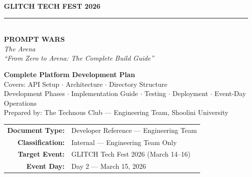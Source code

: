 \documentclass[11pt, a4paper]{article}
\begin{document}

\begin{titlepage}
    \centering
    \vspace*{1cm}
    {\Huge\bfseries\textcolor{primaryblue}{GLITCH TECH FEST 2026}\\[0.3cm]}
    \textcolor{accentgold}{\rule{0.7\textwidth}{2pt}}\\[0.8cm]
    {\fontsize{30}{36}\selectfont\bfseries\textcolor{primaryblue}{PROMPT WARS}}\\[0.2cm]
    {\LARGE\textcolor{sectionblue}{\textit{The Arena}}}\\[0.6cm]
    {\large\textcolor{darktext}{\textit{``From Zero to Arena: The Complete Build Guide''}}}\\[1.2cm]

    \begin{tcolorbox}[
        colback=lightgray, colframe=primaryblue, boxrule=1pt,
        arc=5pt, width=0.85\textwidth, halign=center
    ]
        {\large\textbf{Complete Platform Development Plan}}\\[0.3cm]
        {\normalsize Covers: API Setup $\cdot$ Architecture $\cdot$ Directory Structure\\
        Development Phases $\cdot$ Implementation Guide $\cdot$ Testing $\cdot$ Deployment $\cdot$ Event-Day Operations}\\[0.2cm]
        {\small Prepared by: The Technous Club --- Engineering Team, Shoolini University}
    \end{tcolorbox}

    \vspace{1cm}


    \vfill
    \begin{tabular}{r l}
        \textbf{Document Type:}   & Developer Reference --- Engineering Team \\
        \textbf{Classification:}  & Internal --- Engineering Team Only \\
        \textbf{Target Event:}    & GLITCH Tech Fest 2026 (March 14--16) \\
        \textbf{Event Day:}       & Day 2 --- March 15, 2026 \\
    \end{tabular}
    \vspace{1cm}
\end{titlepage}
\end{document}
